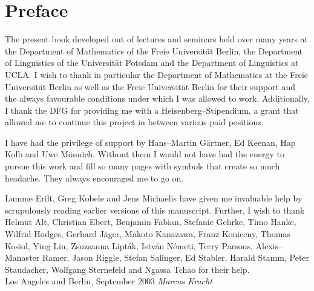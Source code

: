 \chapter*{Preface}
%
%
%
The present book developed out of lectures and seminars held over many 
years at the Department of Mathematics of the Freie Universit\"at Berlin, 
the Department of Linguistics of the Universit\"at Potsdam and the 
Department of Linguistics at UCLA. I wish to thank in particular 
the Department of Mathematics at the Freie Universit\"at Berlin 
as well as the Freie Universit\"at Berlin for their support and 
the always favourable conditions under which I was allowed to work.
Additionally, I thank the DFG for providing me with a 
Heisenberg--Stipendium, a grant that allowed me to continue 
this project in between various paid positions.

I have had the privilege of support by Hans--Martin G\"artner, 
Ed Keenan, Hap Kolb and Uwe M\"onnich. Without them I would 
not have had the energy to pursue this work and fill so many 
pages with symbols that create so much headache. They always 
encouraged me to go on. 

Lumme Erilt, Greg Kobele and Jens Michaelis 
have given me invaluable help by scrupulously reading earlier 
versions of this manuscript. Further, I wish to thank Helmut Alt, 
Christian Ebert, 
Benjamin Fabian, Stefanie Gehrke, Timo Hanke, Wilfrid Hodges, Gerhard 
J\"ager, Makoto Kanazawa, Franz Koniecny, Thomas Kosiol, Ying Lin, 
Zsu\-zsan\-na Lipt\'ak, Istv\'an N\'emeti, Terry Parsons, Alexis--Manaster 
Ramer, Jason Riggle, Stefan Salinger, Ed Stabler, Harald Stamm, Peter 
Staudacher, Wolfgang Sternefeld and Ngassa Tchao for their help.
\\[1cm]
Los Angeles and Berlin, September 2003
\hfill 
{\it Marcus Kracht}
